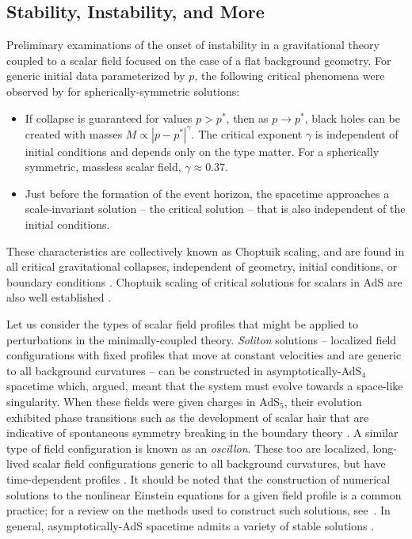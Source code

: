 \documentclass[../PhD.tex]{subfiles}
\begin{document}

\subsection{Stability, Instability, and More}

Preliminary examinations of the onset of instability in a gravitational theory coupled to a scalar field focused on the case of a flat background geometry. For generic initial data parameterized by $p$, the following critical phenomena were observed by \cite{Choptuik:1992jv} for spherically-symmetric solutions:
\begin{itemize}
\item If collapse is guaranteed for values $p > p^*$, then as $p \to p^*$, black holes can be created with masses $M \propto |p - p^*|^\gamma$. The critical exponent $\gamma$ is independent of initial conditions and depends only on the type matter. For a spherically symmetric, massless scalar field, $\gamma \approx 0.37$.
\item Just before the formation of the event horizon, the spacetime approaches a scale-invariant solution -- the critical solution -- that is also independent of the initial conditions.
\end{itemize}
These characteristics are collectively known as Choptuik scaling, and are found in all critical gravitational collapses, independent of geometry, initial conditions, or boundary conditions \cite{gr-qc/0210101, 1208.2934, 1210.0890}. Choptuik scaling of critical solutions for scalars in AdS are also well established \cite{gr-qc/0109002, hep-th/0101194}. 

Let us consider the types of scalar field profiles that might be applied to perturbations in the minimally-coupled theory. \emph{Soliton} solutions -- localized field configurations with fixed profiles that move at constant velocities and are generic to all background curvatures -- can be constructed in asymptotically-AdS$_4$ spacetime which, \cite{hep-th/0406134} argued, meant that the system must evolve towards a space-like singularity. When these fields were given charges in AdS$_5$, their evolution exhibited phase transitions such as the development of scalar hair that are indicative of spontaneous symmetry breaking in the boundary theory \cite{1301.2452}. A similar type of field configuration is known as an \emph{oscillon}. These too are localized, long-lived scalar field configurations generic to all background curvatures, but have time-dependent profiles \cite{hep-ph/9503217}. It should be noted that the construction of numerical solutions to the nonlinear Einstein equations for a given field profile is a common practice; for a review on the methods used to construct such solutions, see~\cite{1510.02804}. In general, asymptotically-AdS spacetime admits a variety of stable solutions \cite{1208.5772}.
\end{document}
